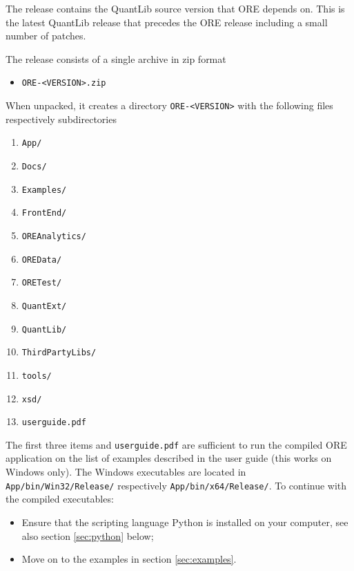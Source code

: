 \documentclass[12pt, a4paper]{article}
\begin{document}
The release contains the QuantLib source version that ORE depends on. This is the latest QuantLib release that precedes the ORE release including a small number of patches.

\medskip
The release consists of a single archive in zip format
\begin{itemize}
\item {\tt ORE-<VERSION>.zip}
\end{itemize}

When unpacked, it creates a directory {\tt ORE-<VERSION>} with the following files respectively subdirectories
\begin{enumerate}
\item {\tt App/}
\item {\tt Docs/}
\item {\tt Examples/}
\item {\tt FrontEnd/}
\item {\tt OREAnalytics/}
\item {\tt OREData/}
\item {\tt ORETest/}
\item {\tt QuantExt/}
\item {\tt QuantLib/}
\item {\tt ThirdPartyLibs/}
\item {\tt tools/}
\item {\tt xsd/}
\item {\tt userguide.pdf}
\end{enumerate} 

The first three items and {\tt userguide.pdf} are sufficient to run the compiled ORE application
on the list of examples described in the user guide (this works on Windows only). The Windows executables are located in {\tt App/bin/Win32/Release/} respectively {\tt App/bin/x64/Release/}. To continue with the compiled
executables:
\begin{itemize}
\item Ensure that the scripting language Python is installed on your computer, see also section \ref{sec:python}
  below;
\item Move on to the examples in section \ref{sec:examples}.
\end{itemize}
\end{document}
